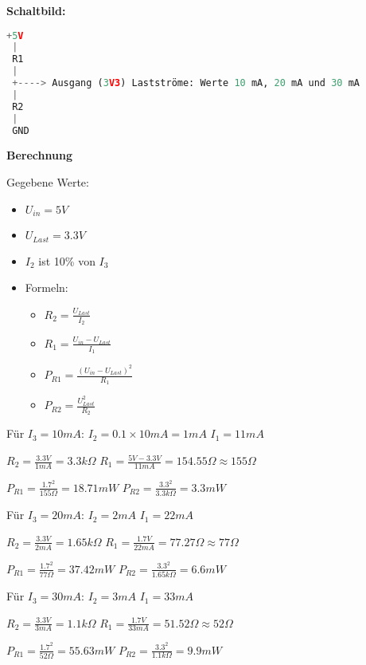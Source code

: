 \documentclass[12pt,a4paper]{scrartcl}
\newcommand{\tightlist}{
  \setlength{\itemsep}{0pt}\setlength{\parskip}{0pt}
}
\begin{document}
\textbf{Schaltbild:}

\begin{lstlisting}[language=Python]
+5V
 |
 R1
 |
 +----> Ausgang (3V3) Lastströme: Werte 10 mA, 20 mA und 30 mA
 |
 R2
 |
 GND
\end{lstlisting}

\textbf{Berechnung}

Gegebene Werte:

\begin{itemize}
\tightlist
\item
  \(U_{in} = 5V\)
\item
  \(U_{Last} = 3.3V\)
\item
  \(I_2\) ist 10\% von \(I_3\)
\item
  Formeln:

  \begin{itemize}
  \tightlist
  \item
    \(R_2 = \frac{U_{Last}}{I_2}\)
  \item
    \(R_1 = \frac{U_{in} - U_{Last}}{I_1}\)
  \item
    \(P_{R1} = \frac{(U_{in} - U_{Last})^2}{R_1}\)
  \item
    \(P_{R2} = \frac{U_{Last}^2}{R_2}\)
  \end{itemize}
\end{itemize}

Für \(I_3 = 10mA\): \(I_2 = 0.1 \times 10mA = 1mA\) \(I_1 = 11mA\)

\(R_2 = \frac{3.3V}{1mA} = 3.3k\Omega\)
\(R_1 = \frac{5V - 3.3V}{11mA} = 154.55\Omega \approx 155\Omega\)

\(P_{R1} = \frac{1.7^2}{155\Omega} = 18.71mW\)
\(P_{R2} = \frac{3.3^2}{3.3k\Omega} = 3.3mW\)

Für \(I_3 = 20mA\): \(I_2 = 2mA\) \(I_1 = 22mA\)

\(R_2 = \frac{3.3V}{2mA} = 1.65k\Omega\)
\(R_1 = \frac{1.7V}{22mA} = 77.27\Omega \approx 77\Omega\)

\(P_{R1} = \frac{1.7^2}{77\Omega} = 37.42mW\)
\(P_{R2} = \frac{3.3^2}{1.65k\Omega} = 6.6mW\)

Für \(I_3 = 30mA\): \(I_2 = 3mA\) \(I_1 = 33mA\)

\(R_2 = \frac{3.3V}{3mA} = 1.1k\Omega\)
\(R_1 = \frac{1.7V}{33mA} = 51.52\Omega \approx 52\Omega\)

\(P_{R1} = \frac{1.7^2}{52\Omega} = 55.63mW\)
\(P_{R2} = \frac{3.3^2}{1.1k\Omega} = 9.9mW\) %
\end{document}
